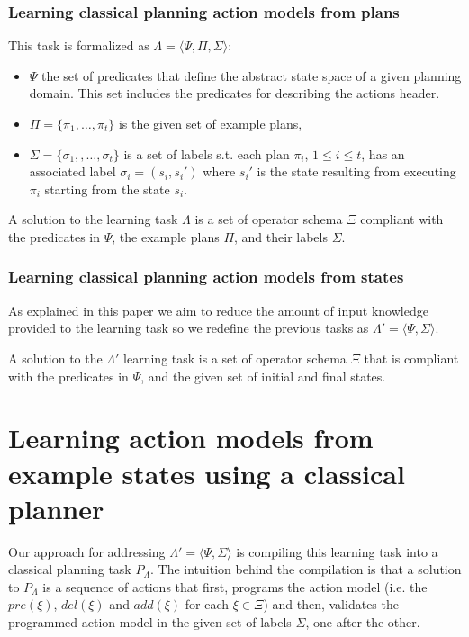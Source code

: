 \documentclass[letterpaper]{article} %
\newcommand{\tup}[1]{{\langle #1 \rangle}}
\begin{document}
\subsubsection{Learning classical planning action models from plans}
This task is formalized as $\Lambda=\tup{\Psi,\Pi,\Sigma}$: 
\begin{itemize}
\item $\Psi$ the set of predicates that define the abstract state space of a given planning domain. This set includes the predicates for describing the actions header.
\item $\Pi=\{\pi_1,\ldots,\pi_t\}$ is the given set of example plans,
\item $\Sigma=\{\sigma_1,,\ldots,\sigma_t\}$ is a set of labels s.t. each plan $\pi_i$, {\small $1\leq i\leq t$}, has an associated label $\sigma_i=(s_i,s_i')$ where $s_i'$ is the state resulting from executing $\pi_i$ starting from the state $s_i$. 
\end{itemize}

A solution to the learning task $\Lambda$ is a set of operator schema $\Xi$ compliant with the predicates in $\Psi$, the example plans $\Pi$, and their labels $\Sigma$.


\subsubsection{Learning classical planning action models from states}

As explained in this paper we aim to reduce the amount of input knowledge provided to the learning task so we redefine the previous tasks as $\Lambda'=\tup{\Psi,\Sigma}$.

A solution to the $\Lambda'$ learning task is a set of operator schema $\Xi$ that is compliant with the predicates in $\Psi$, and the given set of initial and final states.


\section{Learning action models from example states using a classical planner}
Our approach for addressing $\Lambda'=\tup{\Psi,\Sigma}$ is compiling this learning task into a classical planning task $P_{\Lambda}$. The intuition behind the compilation is that a solution to $P_{\Lambda}$ is a sequence of actions that first, programs the action model (i.e. the $pre(\xi)$, $del(\xi)$ and $add(\xi)$ for each $\xi\in\Xi$) and then, validates the programmed action model in the given set of labels $\Sigma$, one after the other.
\end{document}

